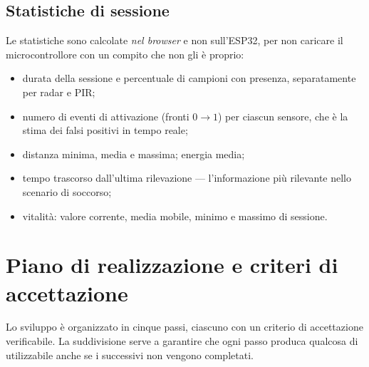 \subsection{Statistiche di sessione}

Le statistiche sono calcolate \emph{nel browser} e non sull'ESP32, per non caricare
il microcontrollore con un compito che non gli è proprio:

\begin{itemize}[leftmargin=1.4em,itemsep=1pt]
  \item durata della sessione e percentuale di campioni con presenza, separatamente
        per radar e PIR;
  \item numero di eventi di attivazione (fronti $0 \to 1$) per ciascun sensore, che
        è la stima dei falsi positivi in tempo reale;
  \item distanza minima, media e massima; energia media;
  \item tempo trascorso dall'ultima rilevazione --- l'informazione più rilevante
        nello scenario di soccorso;
  \item vitalità: valore corrente, media mobile, minimo e massimo di sessione.
\end{itemize}

\section{Piano di realizzazione e criteri di accettazione}
\label{sec:webui-piano}

Lo sviluppo è organizzato in cinque passi, ciascuno con un criterio di accettazione
verificabile. La suddivisione serve a garantire che ogni passo produca qualcosa di
utilizzabile anche se i successivi non vengono completati.

